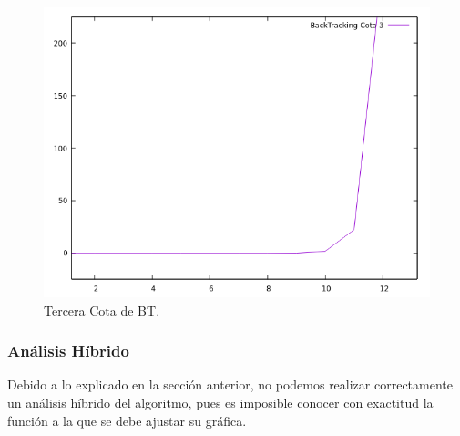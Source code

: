 \documentclass[a4paper,12pt,twoside]{article} %
\begin{document}
\begin{figure}[h]
  \begin{center}
  
  	\includegraphics[scale=0.7]{IMAGENES/bt_c3.png}
  	\caption{Tercera Cota de BT.}
  	
  \end{center}
\end{figure}

\newpage

\subsubsection{Análisis Híbrido}
Debido a lo explicado en la sección anterior, no podemos realizar correctamente un análisis híbrido del algoritmo, pues es imposible conocer con exactitud la función a la que se debe ajustar su gráfica.

\newpage
\end{document}
